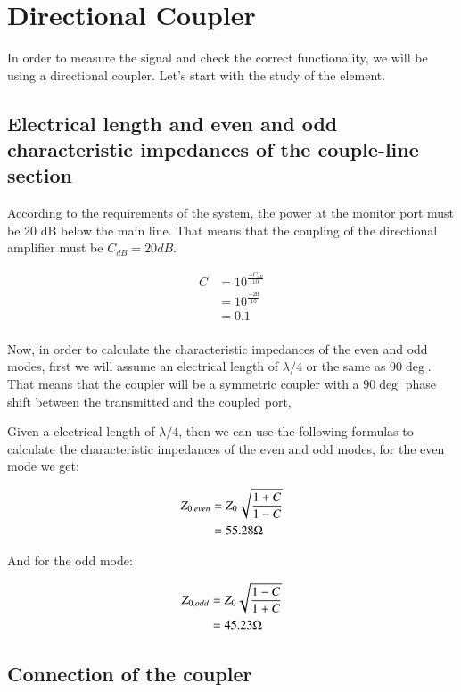 \documentclass[12pt]{report} %
\let\oldsection\section
\renewcommand\section{\clearpage\oldsection}
\begin{document}
\section{Directional Coupler}

In order to measure the signal and check the correct functionality, we will be using a directional coupler. Let's start with the study of the element.

\subsection{Electrical length and even and odd characteristic impedances of the couple-line section}

According to the requirements of the system, the power at the monitor port must be 20 dB below the main line. That means that the coupling of the directional amplifier must be $C_{dB} = 20 dB$.

\begin{align*}
C &= 10^{\frac{- C_{dB}}{10}} \\
&= 10^{\frac{- 20}{10}} \\
&= 0.1 \\
\end{align*}

Now, in order to calculate the characteristic impedances of the even and odd modes, first we will assume an electrical length of $\lambda / 4$ or the same as $90 \deg$. That means that the coupler will be a symmetric coupler with a $90 \deg$ phase shift between the transmitted and the coupled port,

Given a electrical length of $\lambda / 4$, then we can use the following formulas to calculate the characteristic impedances of the even and odd modes, for the even mode we get:

\begin{align*}
Z_{0, even} &= Z_{0} \* \sqrt{\frac{1 + C}{1 - C}} \\
&= 55.28 \Omega \\
\end{align*}

And for the odd mode:

\begin{align*}
Z_{0, odd} &= Z_{0} \* \sqrt{\frac{1 - C}{1 + C}} \\
&= 45.23 \Omega \\
\end{align*}

\subsection{Connection of the coupler}
\end{document}
